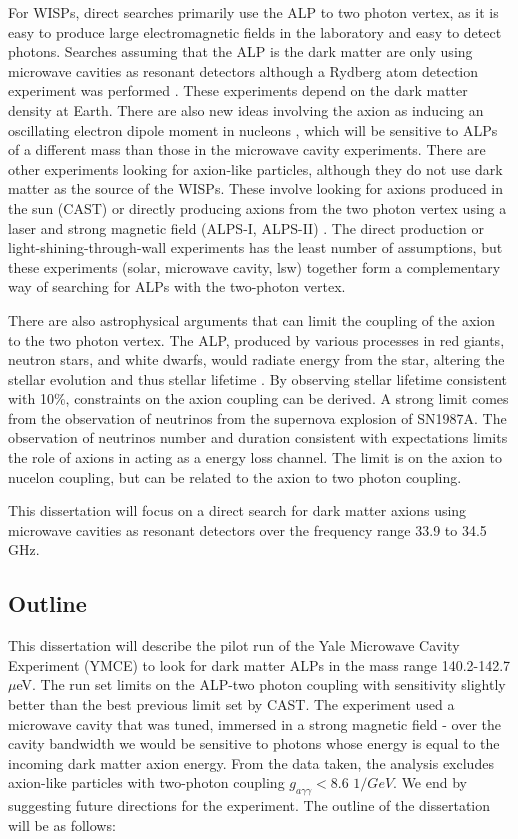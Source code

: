 \documentclass[12pt,twosides]{book}
\begin{document}
For WISPs, direct searches primarily use the ALP to two photon vertex, as it is easy to produce large electromagnetic fields in the laboratory and easy to detect photons. Searches assuming that the ALP is the dark matter are only using microwave cavities as resonant detectors \cite{admx10} although a Rydberg atom detection experiment was performed \cite{yamamoto00}. These experiments depend on the dark matter density at Earth. There are also new ideas involving the axion as inducing an oscillating electron dipole moment in nucleons \cite{budker13}, which will be sensitive to  ALPs of a different mass than those in the microwave cavity experiments. There are other experiments looking for axion-like particles, although they do not use dark matter as the source of the WISPs. These involve looking for axions produced in the sun (CAST) \cite{cast11} or directly producing axions from the two photon vertex using a laser and strong magnetic field (ALPS-I, ALPS-II) \cite{ehret10}. The direct production or light-shining-through-wall experiments has the least number of assumptions, but these experiments (solar, microwave cavity, lsw) together form a complementary way of searching for ALPs with the two-photon vertex.

There are also astrophysical arguments that can limit the coupling of the axion to the two photon vertex. The ALP, produced by various processes in red giants, neutron stars, and white dwarfs, would radiate energy from the star, altering the stellar evolution and thus stellar lifetime \cite{turner89}. By observing stellar lifetime consistent with 10$\%$, constraints on the axion coupling can be derived\cite{raffelt95}. A strong limit comes from the observation of neutrinos from the supernova explosion of SN1987A. The observation of neutrinos number and duration consistent with expectations limits the role of axions in acting as a energy loss channel. The limit is on the axion to nucelon coupling, but can be related to the axion to two photon coupling.

This dissertation will focus on a direct search for dark matter axions using microwave cavities as resonant detectors over the frequency range 33.9 to 34.5 GHz.

\subsection{Outline}

This dissertation will describe the pilot run of the Yale Microwave Cavity Experiment (YMCE) to look for dark matter ALPs in the mass range 140.2-142.7 $\mu$eV. The run set limits on the ALP-two photon coupling with sensitivity slightly better than the best previous limit set by CAST. The experiment used a microwave cavity that was tuned, immersed in a strong magnetic field - over the cavity bandwidth we would be sensitive to photons whose energy is equal to the incoming dark matter axion energy.  From the data taken, the analysis excludes axion-like particles with two-photon coupling $g_{a\gamma\gamma} < 8.6$ $1/GeV$. We end by suggesting future directions for the experiment.
The outline of the dissertation will be as follows:
\end{document}
